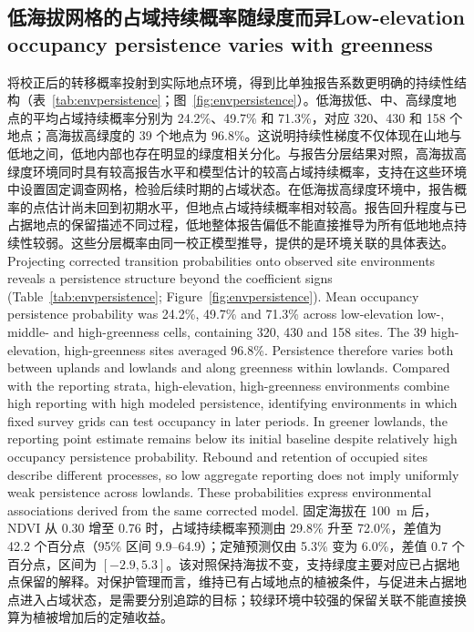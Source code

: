 \subsection{\ifzh 低海拔网格的占域持续概率随绿度而异\else Low-elevation occupancy persistence varies with greenness\fi}
\ifzh
将校正后的转移概率投射到实际地点环境，得到比单独报告系数更明确的持续性结构（表~\ref{tab:envpersistence}；图~\ref{fig:envpersistence}）。低海拔低、中、高绿度地点的平均占域持续概率分别为 24.2\%、49.7\% 和 71.3\%，对应 320、430 和 158 个地点；高海拔高绿度的 39 个地点为 96.8\%。这说明持续性梯度不仅体现在山地与低地之间，低地内部也存在明显的绿度相关分化。与报告分层结果对照，高海拔高绿度环境同时具有较高报告水平和模型估计的较高占域持续概率，支持在这些环境中设置固定调查网格，检验后续时期的占域状态。在低海拔高绿度环境中，报告概率的点估计尚未回到初期水平，但地点占域持续概率相对较高。报告回升程度与已占据地点的保留描述不同过程，低地整体报告偏低不能直接推导为所有低地地点持续性较弱。这些分层概率由同一校正模型推导，提供的是环境关联的具体表达。
\else
Projecting corrected transition probabilities onto observed site environments reveals a persistence structure beyond the coefficient signs (Table~\ref{tab:envpersistence}; Figure~\ref{fig:envpersistence}). Mean occupancy persistence probability was 24.2\%, 49.7\% and 71.3\% across low-elevation low-, middle- and high-greenness cells, containing 320, 430 and 158 sites. The 39 high-elevation, high-greenness sites averaged 96.8\%. Persistence therefore varies both between uplands and lowlands and along greenness within lowlands. Compared with the reporting strata, high-elevation, high-greenness environments combine high reporting with high modeled persistence, identifying environments in which fixed survey grids can test occupancy in later periods. In greener lowlands, the reporting point estimate remains below its initial baseline despite relatively high occupancy persistence probability. Rebound and retention of occupied sites describe different processes, so low aggregate reporting does not imply uniformly weak persistence across lowlands. These probabilities express environmental associations derived from the same corrected model.
\fi
{}
\ifzh
固定海拔在 100~m 后，NDVI 从 0.30 增至 0.76 时，占域持续概率预测由 29.8\% 升至 72.0\%，差值为 42.2 个百分点（95\% 区间 9.9--64.9）；定殖预测仅由 5.3\% 变为 6.0\%，差值 0.7 个百分点，区间为 $[-2.9,5.3]$。该对照保持海拔不变，支持绿度主要对应已占据地点保留的解释。对保护管理而言，维持已有占域地点的植被条件，与促进未占据地点进入占域状态，是需要分别追踪的目标；较绿环境中较强的保留关联不能直接换算为植被增加后的定殖收益。
